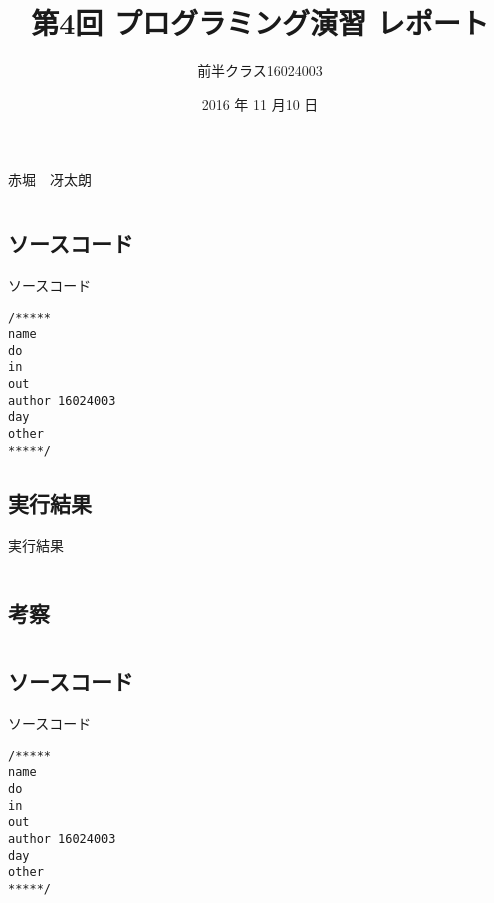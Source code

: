 \documentclass[a4j,titlepage]{jarticle}
\begin{document}

\title{第4回 プログラミング演習 レポート}

\author{前半クラス16024003}{赤堀　冴太朗}

\date{2016 年 11 月10 日}
\maketitle


\section{}
\subsection{ソースコード}
\begin{itembox}[l]{ソースコード}
\begin{verbatim}
/*****
name 
do 
in 
out 
author 16024003
day 
other 
*****/

\end{verbatim}
\end{itembox}

\subsection{実行結果}
\begin{itembox}[l]{実行結果}
\begin{verbatim}

\end{verbatim}
\end{itembox}

\subsection{考察}



\section{}
\subsection{ソースコード}
\begin{itembox}[l]{ソースコード}
\begin{verbatim}
/*****
name 
do 
in 
out 　
author 16024003
day 
other 
*****/

\end{verbatim}
\end{itembox}
\end{document}

